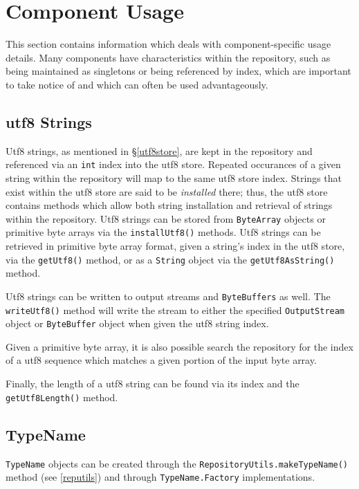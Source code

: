 \documentclass{report}
\begin{document}
\section{Component Usage}

This section contains information which deals with component-specific
usage details. Many components have characteristics within the repository,
such as being maintained as singletons or being referenced by index, which
are important to take notice of and which can often be used advantageously.

\subsection{utf8 Strings}

Utf8 strings, as mentioned in \S \ref{utf8store}, are kept in the
repository and referenced via an \texttt{int} index into the utf8
store. Repeated occurances of a given string within the repository
will map to the same utf8 store index. Strings that exist within the
utf8 store are said to be {\em installed} there; thus, the
utf8 store contains methods which allow both string installation and 
retrieval of strings within the repository. Utf8 strings can be stored
from \texttt{ByteArray} objects or primitive byte arrays via the
\texttt{installUtf8()} methods. Utf8 strings can be retrieved in
primitive byte array format, given a string's index in the utf8 
store, via the \texttt{getUtf8()} method, or as a \texttt{String} object
via the \texttt{getUtf8AsString()} method. 

Utf8 strings can be written to output streams and \texttt{Byte\-Buff\-ers} as
well. The \texttt{writeUtf8()} method will write the stream to either the
specified \texttt{Out\-put\-Stream} object or \texttt{Byte\-Buff\-er} object 
when given the utf8 string index.

Given a primitive byte array, it is also possible search the repository for 
the index of a utf8 sequence which matches a given portion of the input byte 
array.

Finally, the length of a utf8 string can be found via its index and the
\texttt{getUtf8Length()} method.

\subsection{TypeName}

\texttt{TypeName} objects can be created through the
\texttt{Re\-pos\-i\-tory\-Utils.make\-Type\-Name()} method (see \ref{reputils})
and through \texttt{TypeName.Fac\-tory} implementations.
\end{document}
